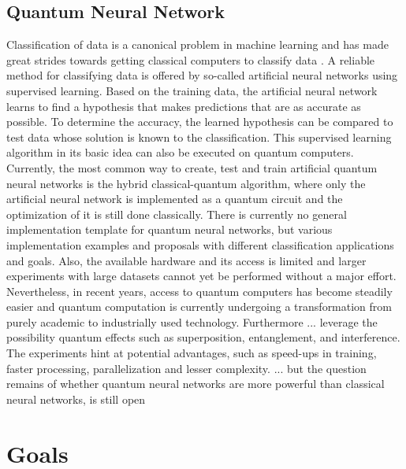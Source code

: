 \subsection{Quantum Neural Network}
Classification of data is a canonical problem in machine learning and has made great strides towards getting classical computers to classify data \cite{Killoran_2019,ClassificationWithQNN}. A reliable method for classifying data is offered by so-called artificial neural networks using supervised learning. Based on the training data, the artificial neural network learns to find a hypothesis that makes predictions that are as accurate as possible. To determine the accuracy, the learned hypothesis can be compared to test data whose solution is known to the classification. This supervised learning algorithm in its basic idea can also be executed on quantum computers. Currently, the most common way to create, test and train artificial quantum neural networks is the hybrid classical-quantum algorithm, where only the artificial neural network is implemented as a quantum circuit and the optimization of it is still done classically.
There is currently no general implementation template for quantum neural networks, but various implementation examples and proposals with different classification applications and goals. Also, the available hardware and its access is limited and larger experiments with large datasets cannot yet be performed without a major effort. Nevertheless, in recent years, access to quantum computers has become steadily easier and quantum computation is currently undergoing a transformation from purely academic to industrially used technology\cite{schuldCircuitcentricQuantumClassifiers2020}. Furthermore ... leverage the possibility quantum effects such as superposition, entanglement, and interference. The experiments hint at potential advantages, such as speed-ups in training, faster processing, parallelization and lesser complexity. ... but the question remains of whether quantum neural networks are more powerful than classical neural networks, is still open

\section{Goals}

